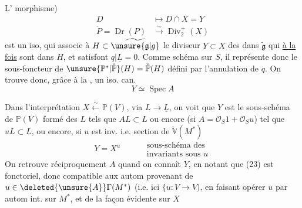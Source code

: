 L' morphisme)
\[
 \begin{aligned}
 D&\longmapsto D\cap X=Y\\
 \check P=\operatorname{Dr}(P)&\xrightarrow{\sim}\operatorname{Div}_2^+(X)
 \end{aligned}\tag*{(22)}
\]
est un iso, qui associe à  $H\subset\widetilde{\unsure{\mathfrak g|g}}$ le diviseur $Y\subset X$ des  dans $\widetilde{\mathfrak g}$ qui \uline{à la fois} sont dans $H$, et satisfont $q|\underline L=0$.
 Comme schéma sur $S$, il représente donc le sous-foncteur de $\unsure{\mathbb P^{*}|\check{\mathbb P}}(H)=\check{\mathbb P}(H)$ défini par l'annulation de $q$. On trouve donc, grâce à la , un iso. can.
\[
 Y\simeq\operatorname{Spec} A\tag*{(23)}
\]

Dans l'interprétation $X\xleftarrow{\sim}\mathbb P(V)$, via $L\rightarrow\underline L$, on voit que $Y$ est le sous-schéma de $\mathbb P(V)$ formé des $L$ tels que $AL\subset L$ ou encore (si $A=\mathcal O_S1+\mathcal O_Su$) tel que $uL\subset L$, ou encore, si $u$ est inv. i.e. section de $\check{\mathbb V}(M^*)$
\[
 Y=X^u\qquad\begin{aligned}
 &\text{sous-schéma des}\\[-2pt]
 &\text{invariants sous }u
 \end{aligned}\tag*{(24)}
\]
On retrouve réciproquement $A$ quand on connaît $Y$, en notant que  (23) est fonctoriel, donc compatible aux autom provenant de $u\in\deleted{\unsure{A}}\Gamma(M^*)$ (i.e. ici $\{u:V\to V)$, en faisant opérer $u$ par autom int. sur $M^*$, et de la façon évidente sur $X$ \unsure{$\leftarrow$|\ldots}
